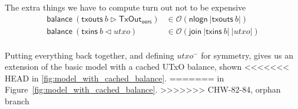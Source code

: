 \documentclass{article}
\newcommand{\order}[1]{\mathcal{O}\left(#1\right)}
\newcommand{\restrictdom}{\lhd}
\newcommand{\restrictrange}{\rhd}
\theoremstyle{definition}{
  \newtheorem{lemma}{Lemma}[section] %
  \newtheorem{definition}[lemma]{Definition}
}
\theoremstyle{theorem}{
  \newtheorem{invariant}[lemma]{Invariant}
  \newtheorem{proofobligation}[lemma]{Proof Obligation}
}
\numberwithin{equation}{lemma}
\begin{document}
The extra things we have to compute turn out not to be expensive
\begin{equation*}
\begin{split}
\mathsf{balance} ~ (\mathsf{txouts} ~ b \restrictrange \mathsf{TxOut_{ours}})  & \in \order{\mathsf{nlogn} ~ |\mathsf{txouts}~ b|} \\
\mathsf{balance} ~ (\mathsf{txins} ~ b \restrictdom utxo) & \in \order{\mathsf{join} ~ |\mathsf{txins}~ b| ~ |utxo|} \\
\end{split}
\end{equation*}

Putting everything back together, and defining $utxo^-$ for symmetry, gives
us an extension of the basic model with a cached UTxO balance, shown
<<<<<<< HEAD
in \cref{fig:model_with_cached_balance}.
=======
in Figure~\ref{fig:model_with_cached_balance}.
>>>>>>> CHW-82-84, orphan branch
\end{document}
